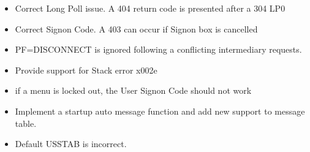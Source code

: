 \documentclass[letterpaper,10pt,english]{sphinxmanual}
\begin{document}
\sphinxAtStartPar
{}
\begin{itemize}
\item {} 
\sphinxAtStartPar
Correct Long Poll issue. A 404 return code is presented after a 304 LP0

\end{itemize}

\sphinxAtStartPar
{}
\begin{itemize}
\item {} 
\sphinxAtStartPar
Correct Signon Code. A 403 can occur if Signon box is cancelled

\end{itemize}

\sphinxAtStartPar
{}
\begin{itemize}
\item {} 
\sphinxAtStartPar
PF=DISCONNECT is ignored following a conflicting intermediary requests.

\end{itemize}

\sphinxAtStartPar
{}
\begin{itemize}
\item {} 
\sphinxAtStartPar
Provide support for Stack error x002e

\end{itemize}

\sphinxAtStartPar
{}
\begin{itemize}
\item {} 
\sphinxAtStartPar
if a menu is locked out, the User Signon Code should not work

\end{itemize}

\sphinxAtStartPar
{}
\begin{itemize}
\item {} 
\sphinxAtStartPar
Implement a startup auto message function and add new support to message table.

\end{itemize}

\sphinxAtStartPar
{}
\begin{itemize}
\item {} 
\sphinxAtStartPar
Default USSTAB is incorrect.

\end{itemize}
\end{document}
